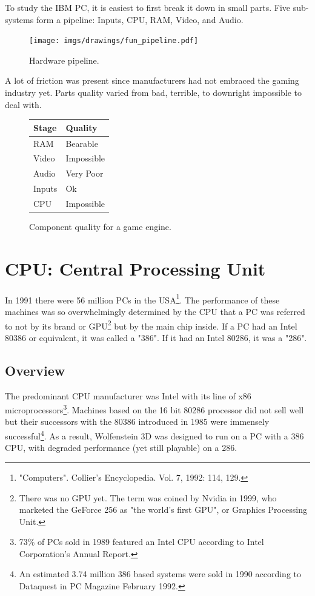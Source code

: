 \documentclass[book.tex]{subfiles}
\begin{document}
\label{chapter_hardware}
To study the IBM PC, it is easiest to first break it down in small parts. Five sub-systems form a pipeline: Inputs, CPU, RAM, Video, and Audio.\\
\begin{figure}[H]
\centering
\texttt{[image: imgs/drawings/fun\_pipeline.pdf]}
\caption{Hardware pipeline.}
\label{fig:digraph}
\end{figure}

A lot of friction was present since manufacturers had not embraced the gaming industry yet. Parts quality varied from  bad, terrible, to downright impossible to deal with.\\
\par

\begin{figure}[H]
\centering
\begin{tabularx}{\textwidth}{ X X  }
  \toprule
  \textbf{Stage} & \textbf{Quality} \\ \bottomrule
  RAM & Bearable \\ 
  Video & Impossible \\ 
  Audio & Very Poor \\ 
  Inputs & Ok \\ 
  CPU & Impossible \\ \bottomrule
\end{tabularx}
\caption{Component quality for a game engine.}
\end{figure}



\section{CPU: Central Processing Unit}
  


  In 1991 there were 56 million PCs in the USA\footnote{"Computers". Collier's Encyclopedia. Vol. 7, 1992: 114, 129.}. The performance of these machines was so overwhelmingly determined by the CPU that a PC was referred to not by its brand or GPU\footnote{There was no GPU yet. The term was coined by Nvidia in 1999, who marketed the GeForce 256 as "the world's first GPU", or Graphics Processing Unit.} but by the main chip inside. If a PC had an Intel 80386 or equivalent, it was called a "386". If it had an Intel 80286, it was a "286".\\
\subsection{Overview}
  The predominant CPU manufacturer was Intel with its line of x86 microprocessors\footnote{73\% of PCs sold in 1989 featured an Intel CPU according to Intel Corporation's Annual Report.}. Machines based on the 16 bit 80286 processor did not sell well but their successors with the 80386 introduced in 1985 were immensely successful\footnote{An estimated 3.74 million 386 based systems were sold in 1990 according to Dataquest in PC Magazine February 1992.}. As a result, Wolfenstein 3D was designed to run on a PC with a 386 CPU, with degraded performance (yet still playable) on a 286.\\
\par
\end{document}
